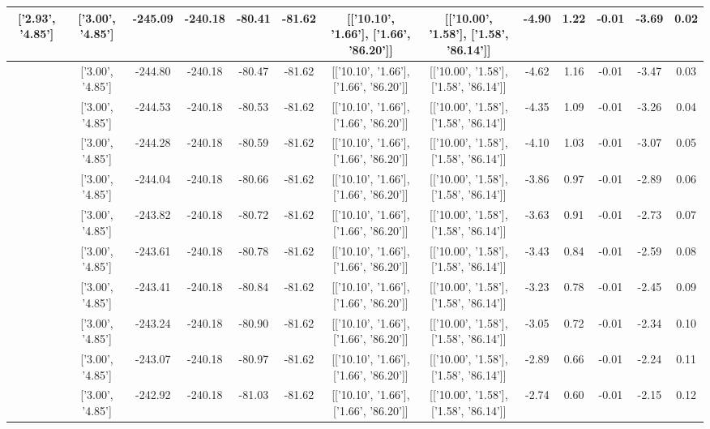 \begin{table}[htbp]
\begin{adjustbox}{angle=90}
\begin{tabular}{|c|c|c|c|c|c|c|c|c|c|c|c|c|}
 ['2.93', '4.85'] & ['3.00', '4.85'] & -245.09 & -240.18 & -80.41 & -81.62 & [['10.10', '1.66'], ['1.66', '86.20']] & [['10.00', '1.58'], ['1.58', '86.14']] & -4.90 & 1.22 & -0.01 & -3.69 & 0.02\\ \hline
 ['2.93', '4.85'] & ['3.00', '4.85'] & -244.80 & -240.18 & -80.47 & -81.62 & [['10.10', '1.66'], ['1.66', '86.20']] & [['10.00', '1.58'], ['1.58', '86.14']] & -4.62 & 1.16 & -0.01 & -3.47 & 0.03\\ \hline
 ['2.93', '4.85'] & ['3.00', '4.85'] & -244.53 & -240.18 & -80.53 & -81.62 & [['10.10', '1.66'], ['1.66', '86.20']] & [['10.00', '1.58'], ['1.58', '86.14']] & -4.35 & 1.09 & -0.01 & -3.26 & 0.04\\ \hline
 ['2.94', '4.85'] & ['3.00', '4.85'] & -244.28 & -240.18 & -80.59 & -81.62 & [['10.10', '1.66'], ['1.66', '86.20']] & [['10.00', '1.58'], ['1.58', '86.14']] & -4.10 & 1.03 & -0.01 & -3.07 & 0.05\\ \hline
 ['2.94', '4.85'] & ['3.00', '4.85'] & -244.04 & -240.18 & -80.66 & -81.62 & [['10.10', '1.66'], ['1.66', '86.20']] & [['10.00', '1.58'], ['1.58', '86.14']] & -3.86 & 0.97 & -0.01 & -2.89 & 0.06\\ \hline
 ['2.94', '4.85'] & ['3.00', '4.85'] & -243.82 & -240.18 & -80.72 & -81.62 & [['10.10', '1.66'], ['1.66', '86.20']] & [['10.00', '1.58'], ['1.58', '86.14']] & -3.63 & 0.91 & -0.01 & -2.73 & 0.07\\ \hline
 ['2.95', '4.85'] & ['3.00', '4.85'] & -243.61 & -240.18 & -80.78 & -81.62 & [['10.10', '1.66'], ['1.66', '86.20']] & [['10.00', '1.58'], ['1.58', '86.14']] & -3.43 & 0.84 & -0.01 & -2.59 & 0.08\\ \hline
 ['2.95', '4.85'] & ['3.00', '4.85'] & -243.41 & -240.18 & -80.84 & -81.62 & [['10.10', '1.66'], ['1.66', '86.20']] & [['10.00', '1.58'], ['1.58', '86.14']] & -3.23 & 0.78 & -0.01 & -2.45 & 0.09\\ \hline
 ['2.96', '4.85'] & ['3.00', '4.85'] & -243.24 & -240.18 & -80.90 & -81.62 & [['10.10', '1.66'], ['1.66', '86.20']] & [['10.00', '1.58'], ['1.58', '86.14']] & -3.05 & 0.72 & -0.01 & -2.34 & 0.10\\ \hline
 ['2.96', '4.85'] & ['3.00', '4.85'] & -243.07 & -240.18 & -80.97 & -81.62 & [['10.10', '1.66'], ['1.66', '86.20']] & [['10.00', '1.58'], ['1.58', '86.14']] & -2.89 & 0.66 & -0.01 & -2.24 & 0.11\\ \hline
 ['2.96', '4.85'] & ['3.00', '4.85'] & -242.92 & -240.18 & -81.03 & -81.62 & [['10.10', '1.66'], ['1.66', '86.20']] & [['10.00', '1.58'], ['1.58', '86.14']] & -2.74 & 0.60 & -0.01 & -2.15 & 0.12\\ \hline

\end{tabular}
\end{adjustbox}
\end{table}

